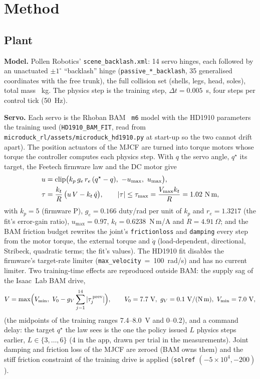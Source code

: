 \documentclass[11pt]{article}
\newcommand{\code}[1]{\texttt{\small #1}}
\begin{document}
\section{Method}\label{sec:method}

\subsection{Plant}
\textbf{Model.} Pollen Robotics' \code{scene\_backlash.xml}: 14 servo hinges, each followed by an unactuated
$\pm1^\circ$ ``backlash'' hinge (\code{passive\_*\_backlash}, 35 generalised coordinates with the free trunk), the
full collision set (shells, legs, head, soles), total mass \plantMass~kg. The physics step is the training step,
$\Delta t=0.005$~s, four steps per control tick (50~Hz).

\textbf{Servo.} Each servo is the Rhoban BAM~\cite{bam} \code{m6} model with the HD1910 parameters the training
used (\code{HD1910\_BAM\_FIT}, read from \code{microduck\_rl/assets/microduck\_hd1910.py} at start-up so the two
cannot drift apart). The position actuators of the MJCF are turned into torque motors whose torque the controller
computes each physics step. With $q$ the servo angle, $q^\star$ its target, the Feetech firmware law and the DC
motor give
\begin{align}
  u &= \operatorname{clip}\!\big(k_p\, g_e\, r_e\,(q^\star - q),\ -u_{\max},\ u_{\max}\big), \label{eq:duty}\\
  \tau &= \frac{k_t}{R}\,\big(u\,V - k_t\,\dot q\big),\qquad
  |\tau| \le \tau_{\max} = \frac{V_{\max}k_t}{R} = 1.02~\text{N\,m},
\end{align}
with $k_p = 5$ (firmware P), $g_e = 0.166$ duty/rad per unit of $k_p$ and $r_e = 1.3217$ (the fit's error-gain ratio),
$u_{\max} = 0.97$, $k_t = 0.6238$~N\,m/A and $R = 4.91~\Omega$; and the BAM friction budget rewrites the joint's \code{frictionloss} and \code{damping} every step from the motor
torque, the external torque and $\dot q$ (load-dependent, directional, Stribeck, quadratic terms; the fit's
values). The HD1910 fit disables the firmware's target-rate limiter (\code{max\_velocity}~=~100~rad/s) and has no
current limiter. Two training-time effects are reproduced outside BAM: the supply sag of the Isaac~Lab BAM drive,
\begin{equation}
  V = \max\!\Big(V_{\min},\ V_0 - g_V \sum_{j=1}^{14} |\tau_j^{\,\text{prev}}|\Big),\qquad V_0 = 7.7~\text{V},\ g_V =
  0.1~\text{V/(N\,m)},\ V_{\min} = 7.0~\text{V},
\end{equation}
(the midpoints of the training ranges 7.4--8.0~V and 0--0.2), and a command delay: the target $q^\star$ the law
sees is the one the policy issued $L$ physics steps earlier, $L\in\{3,\dots,6\}$ (4 in the app, drawn per trial in
the measurements). Joint damping and friction loss of the MJCF are zeroed (BAM owns them) and the stiff friction
constraint of the training drive is applied (\code{solref} $(-5\times10^4, -200)$).
\end{document}
